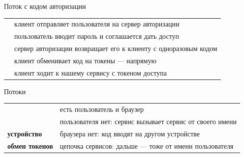 \documentclass[aspectratio=169,10pt,t]{beamer}
\begin{document}
\begin{frame}{Поток с кодом авторизации}
  \slidetop

  {\renewcommand{\arraystretch}{1.3}
  \begin{tabular}{@{}L{0.7cm}L{12.1cm}@{}}
     & клиент отправляет пользователя на сервер авторизации \\
     & пользователь вводит пароль  и соглашается дать доступ \\
     & сервер авторизации возвращает его к клиенту с одноразовым кодом \\
     & клиент обменивает код на токены --- напрямую \\
     & клиент ходит к нашему сервису с токеном доступа \\
  \end{tabular}}

  \slidegap
\end{frame}

\begin{frame}{Потоки}
  \slidetop
  {\renewcommand{\arraystretch}{1.6}
  \begin{tabular}{@{}L{4.6cm}L{8.2cm}@{}}
             & есть пользователь и браузер \\
      & пользователя нет: сервис вызывает сервис от
      своего имени \\
    \textbf{устройство}                   & браузера нет: код вводят на другом
      устройстве \\
    \textbf{обмен токенов}                & цепочка сервисов: дальше --- тоже от имени
      пользователя \\
  \end{tabular}}

  \slidegap
\end{frame}
\end{document}
